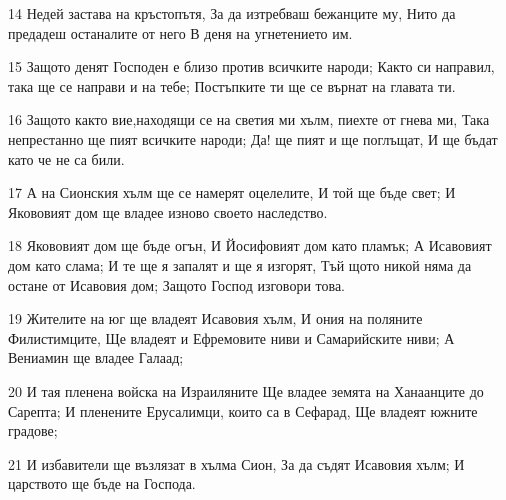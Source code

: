 \par 14 Недей застава на кръстопътя, За да изтребваш бежанците му, Нито да предадеш останалите от него В деня на угнетението им.
\par 15 Защото денят Господен е близо против всичките народи; Както си направил, така ще се направи и на тебе; Постъпките ти ще се върнат на главата ти.
\par 16 Защото както вие,находящи се на светия ми хълм, пиехте от гнева ми, Така непрестанно ще пият всичките народи; Да! ще пият и ще поглъщат, И ще бъдат като че не са били.
\par 17 А на Сионския хълм ще се намерят оцелелите, И той ще бъде свет; И Якововият дом ще владее изново своето наследство.
\par 18 Якововият дом ще бъде огън, И Йосифовият дом като пламък; А Исавовият дом като слама; И те ще я запалят и ще я изгорят, Тъй щото никой няма да остане от Исавовия дом; Защото Господ изговори това.
\par 19 Жителите на юг ще владеят Исавовия хълм, И ония на поляните Филистимците, Ще владеят и Ефремовите ниви и Самарийските ниви; А Вениамин ще владее Галаад;
\par 20 И тая пленена войска на Израиляните Ще владее земята на Ханаанците до Сарепта; И пленените Ерусалимци, които са в Сефарад, Ще владеят южните градове;
\par 21 И избавители ще възлязат в хълма Сион, За да съдят Исавовия хълм; И царството ще бъде на Господа.


